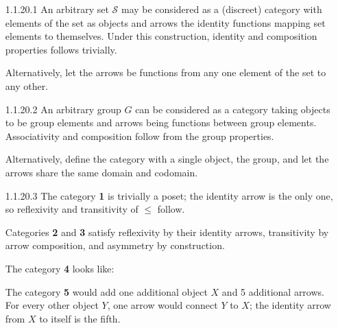 \documentclass{article}
\begin{document}
\begin{enumerate}
\item[1.1.20.1]
  An arbitrary set $\mathcal{S}$ may be considered as a (discreet) category with elements of the set as objects and arrows the identity functions mapping set elements to themselves.
  Under this construction, identity and composition properties follows trivially.
  
  Alternatively, let the arrows be functions from any one element of the set to any other.

\item[]
\item[1.1.20.2]
  An arbitrary group $G$ can be considered as a category taking objects to be group elements and arrows being functions between group elements.
  Associativity and composition follow from the group properties.

  Alternatively, define the category with a single object, the group, and let the arrows share the same domain and codomain.

\item[]
\item[1.1.20.3]
  The category \textbf{1} is trivially a poset; the identity arrow is the only one, so reflexivity and transitivity of $\le$ follow.
  
  Categories \textbf{2} and \textbf{3} satisfy reflexivity by their identity arrows, transitivity by arrow composition, and asymmetry by construction.

  The category \textbf{4} looks like:

  \begin{center}
  \end{center}

  The category \textbf{5} would add one additional object $X$ and 5 additional arrows.
  For every other object $Y$, one arrow would connect $Y$ to $X$; the identity arrow from $X$ to itself is the fifth.


\end{enumerate}
\end{document}
